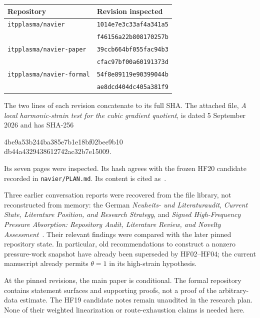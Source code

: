 \documentclass[11pt,a4paper]{article}
\theoremstyle{definition}
\newcommand{\repo}[1]{\texttt{#1}}
\begin{document}
\begin{center}
\begin{tabular}{@{}ll@{}}\toprule
Repository & Revision inspected\\\midrule
\repo{itpplasma/navier} & \texttt{1014e7e3c33af4a341a5}\\
 & \texttt{f46156a22b808170257b}\\[2pt]
\repo{itpplasma/navier-paper} & \texttt{39ccb664bf055fac94b3}\\
 & \texttt{cfac97bf00a60191373d}\\[2pt]
\repo{itpplasma/navier-formal} & \texttt{54f8e89119e90399044b}\\
 & \texttt{ae8dcd404dc405a381f9}\\\bottomrule
\end{tabular}
\end{center}
The two lines of each revision concatenate to its full SHA. The attached file, \emph{A local harmonic-strain test for the cubic gradient quotient}, is dated 5 September 2026 and has SHA-256
\begin{center}\small\ttfamily
4be9a53b244ba385e7b1e18bf02bee9b10\\
db44a4329438612742ac32b7e15009.
\end{center}
Its seven pages were inspected. Its hash agrees with the frozen HF20 candidate recorded in \repo{navier/PLAN.md}. Its content is cited as~\cite{HF20}.

Three earlier conversation reports were recovered from the file library, not reconstructed from memory: the German \emph{Neuheits- und Literaturaudit}, \emph{Current State, Literature Position, and Research Strategy}, and \emph{Signed High-Frequency Pressure Absorption: Repository Audit, Literature Review, and Novelty Assessment}~\cite{Survey1,Survey2,Survey3}. Their relevant findings were compared with the later pinned repository state. In particular, old recommendations to construct a nonzero pressure-work snapshot have already been superseded by HF02--HF04; the current manuscript already permits $\theta=1$ in its high-strain hypothesis.

At the pinned revisions, the main paper is conditional. The formal repository contains statement surfaces and supporting proofs, not a proof of the arbitrary-data estimate. The HF19 candidate notes remain unaudited in the research plan. None of their weighted linearization or route-exhaustion claims is needed here.
\end{document}
